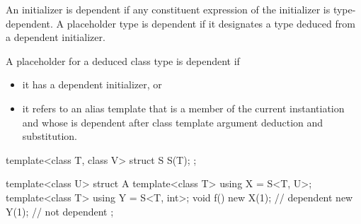 \pnum
An initializer is dependent if
any constituent expression of the initializer
is type-dependent.
A placeholder type is dependent if
it designates a type deduced from a dependent initializer.

\pnum
A placeholder for a deduced class type
is dependent if
\begin{itemize}
\item
it has a dependent initializer, or
\item
it refers to an alias template
that is a member of the current instantiation and
whose  is dependent after
class template argument deduction
and substitution.
\end{itemize}

\pnum
\begin{example}
\begin{codeblock}
template<class T, class V>
struct S { S(T); };

template<class U>
struct A {
  template<class T> using X = S<T, U>;
  template<class T> using Y = S<T, int>;
  void f() {
    new X(1);                   // dependent
    new Y(1);                   // not dependent
  }
};
\end{codeblock}
\end{example}

